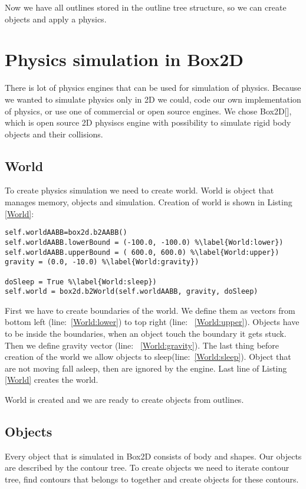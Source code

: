 \documentclass{ifacconf}
\begin{document}
Now we have all outlines stored in the outline tree structure, so we can create
objects and apply a physics.

\section{Physics simulation in Box2D}
There is lot of physics engines that can be used for simulation of physics.
Because we wanted to simulate physics only in 2D we could, code our own
implementation of physics, or use one of commercial or open source engines. We
chose Box2D[\cite{GameEngines}], which is open source 2D physiscs engine with
possibility to simulate rigid body objects and their collisions.
\subsection{World}
To create physics simulation we need to create world. World is object that
manages memory, objects and simulation. Creation of world is shown in Listing
\ref{World}:
\begin{lstlisting}[caption=Creation of Box2D world,label=World]
self.worldAABB=box2d.b2AABB()
self.worldAABB.lowerBound = (-100.0, -100.0) %\label{World:lower})
self.worldAABB.upperBound = ( 600.0, 600.0)	%\label{World:upper})
gravity = (0.0, -10.0) %\label{World:gravity})

doSleep = True %\label{World:sleep})
self.world = box2d.b2World(self.worldAABB, gravity, doSleep)
\end{lstlisting}
First we have to create boundaries of the world. We define them as vectors from
bottom left (line:~\ref{World:lower}) to top right (line:~
\ref{World:upper}). Objects have to be inside the boundaries, when an object
touch the boundary it gets stuck. Then we define gravity vector (line:~
\ref{World:gravity}). The last thing before creation of the world we allow
objects to sleep(line:~\ref{World:sleep}). Object that are not moving fall
asleep, then are ignored by the engine. Last line of Listing \ref{World} creates
the world.

World is created and we are ready to create objects from outlines.
\subsection{Objects}
Every object that is simulated in Box2D consists of body and shapes. Our objects
are described by the contour tree. To create objects we need to iterate contour
tree, find contours that belongs to together and create objects for these
contours.
\end{document}
